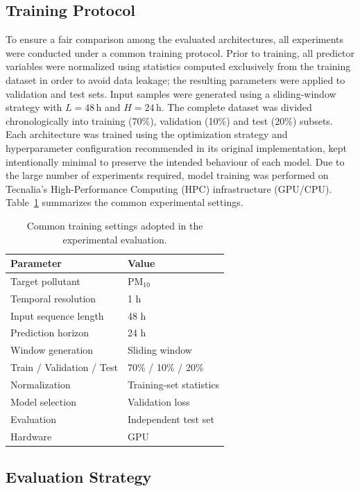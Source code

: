 \documentclass[11pt]{article}
\newenvironment{revnewblock}{%
  \begingroup\color{orange!75!black}%
}{%
  \endgroup%
}
\begin{document}
\begin{revnewblock}
\subsection{Training Protocol}
To ensure a fair comparison among the evaluated architectures, all experiments were conducted under a common training protocol. Prior to training, all predictor variables were normalized using statistics computed exclusively from the training dataset in order to avoid data leakage; the resulting parameters were applied to validation and test sets. Input samples were generated using a sliding-window strategy with $L{=}48$\,h and $H{=}24$\,h. The complete dataset was divided chronologically into training (70\%), validation (10\%) and test (20\%) subsets. Each architecture was trained using the optimization strategy and hyperparameter configuration recommended in its original implementation, kept intentionally minimal to preserve the intended behaviour of each model. Due to the large number of experiments required, model training was performed on Tecnalia's High-Performance Computing (HPC) infrastructure (GPU/CPU). Table~\ref{tab:training} summarizes the common experimental settings.

\begin{table}[ht]
\centering
\caption{Common training settings adopted in the experimental evaluation.}
\label{tab:training}
\renewcommand{\arraystretch}{1.15}
\begin{tabular}{ll}
\toprule
\textbf{Parameter} & \textbf{Value} \\
\midrule
Target pollutant & PM$_{10}$ \\
Temporal resolution & 1 h \\
Input sequence length & 48 h \\
Prediction horizon & 24 h \\
Window generation & Sliding window \\
Train / Validation / Test & 70\% / 10\% / 20\% \\
Normalization & Training-set statistics \\
Model selection & Validation loss \\
Evaluation & Independent test set \\
Hardware & GPU \\
\bottomrule
\end{tabular}
\end{table}

\subsection{Evaluation Strategy}


\end{revnewblock}
\end{document}
